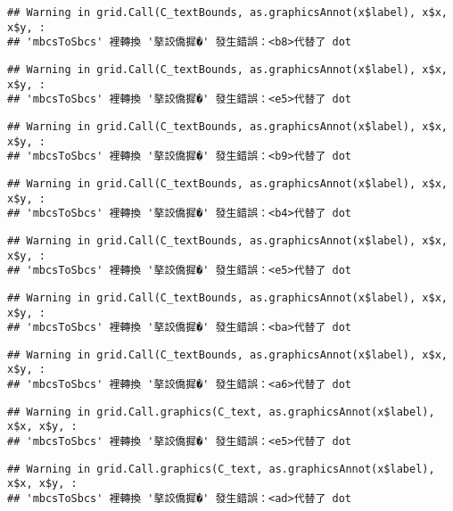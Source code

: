 \documentclass[
]{article}
\begin{document}
\begin{verbatim}
## Warning in grid.Call(C_textBounds, as.graphicsAnnot(x$label), x$x, x$y, :
## 'mbcsToSbcs' 裡轉換 '摮詨僑摨�' 發生錯誤：<b8>代替了 dot
\end{verbatim}

\begin{verbatim}
## Warning in grid.Call(C_textBounds, as.graphicsAnnot(x$label), x$x, x$y, :
## 'mbcsToSbcs' 裡轉換 '摮詨僑摨�' 發生錯誤：<e5>代替了 dot
\end{verbatim}

\begin{verbatim}
## Warning in grid.Call(C_textBounds, as.graphicsAnnot(x$label), x$x, x$y, :
## 'mbcsToSbcs' 裡轉換 '摮詨僑摨�' 發生錯誤：<b9>代替了 dot
\end{verbatim}

\begin{verbatim}
## Warning in grid.Call(C_textBounds, as.graphicsAnnot(x$label), x$x, x$y, :
## 'mbcsToSbcs' 裡轉換 '摮詨僑摨�' 發生錯誤：<b4>代替了 dot
\end{verbatim}

\begin{verbatim}
## Warning in grid.Call(C_textBounds, as.graphicsAnnot(x$label), x$x, x$y, :
## 'mbcsToSbcs' 裡轉換 '摮詨僑摨�' 發生錯誤：<e5>代替了 dot
\end{verbatim}

\begin{verbatim}
## Warning in grid.Call(C_textBounds, as.graphicsAnnot(x$label), x$x, x$y, :
## 'mbcsToSbcs' 裡轉換 '摮詨僑摨�' 發生錯誤：<ba>代替了 dot
\end{verbatim}

\begin{verbatim}
## Warning in grid.Call(C_textBounds, as.graphicsAnnot(x$label), x$x, x$y, :
## 'mbcsToSbcs' 裡轉換 '摮詨僑摨�' 發生錯誤：<a6>代替了 dot
\end{verbatim}

\begin{verbatim}
## Warning in grid.Call.graphics(C_text, as.graphicsAnnot(x$label), x$x, x$y, :
## 'mbcsToSbcs' 裡轉換 '摮詨僑摨�' 發生錯誤：<e5>代替了 dot
\end{verbatim}

\begin{verbatim}
## Warning in grid.Call.graphics(C_text, as.graphicsAnnot(x$label), x$x, x$y, :
## 'mbcsToSbcs' 裡轉換 '摮詨僑摨�' 發生錯誤：<ad>代替了 dot
\end{verbatim}
\end{document}

